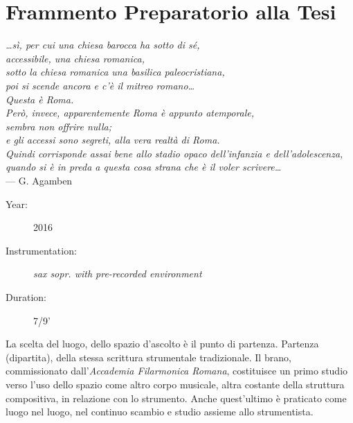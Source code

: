 
\section*{Frammento Preparatorio alla Tesi}
\label{sec:frammento}

\begin{flushright}{\slshape
  …sì, per cui una chiesa barocca ha sotto di sé, \\
  accessibile, una chiesa romanica, \\
  sotto la chiesa romanica una basilica paleocristiana, \\
  poi si scende ancora e c’è il mitreo romano… \\
  Questa è Roma. \\
  Però, invece, apparentemente Roma è appunto atemporale, \\
  sembra non offrire nulla; \\
  e gli accessi sono segreti, alla vera realtà di Roma. \\
  Quindi corrisponde assai bene allo stadio opaco dell’infanzia e dell’adolescenza, \\
  quando si è in preda a questa cosa strana che è il voler scrivere…} \\ \medskip
    --- G. Agamben
\end{flushright}

\begin{description}
  \item[Year:] 2016
  \item[Instrumentation:] \emph {sax sopr. with pre-recorded environment}
  \item[Duration:] 7/9'
\end{description}

La scelta del luogo, dello spazio d'ascolto è il punto di partenza.
Partenza (dipartita), della stessa scrittura strumentale tradizionale.
Il brano, commissionato dall'\emph{Accademia Filarmonica Romana}, costituisce un primo studio
verso l'uso dello spazio come altro corpo musicale, altra costante della struttura
compositiva, in  relazione con lo strumento.
Anche quest'ultimo è praticato come luogo nel luogo, nel continuo scambio e
studio assieme allo strumentista.

\bigskip

